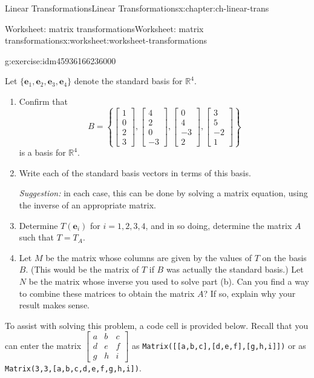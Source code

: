 \documentclass[oneside,10pt,]{book}
\newcommand{\mono}[1]{\texttt{#1}}
\numberwithin{equation}{section}
\newcommand{\R}{\mathbb{R}}
\newcommand{\vece}{\mathbf{e}}
\newcommand{\amp}{&}
\begin{document}
\begin{chapterptx}{Linear Transformations}{}{Linear Transformations}{}{}{x:chapter:ch-linear-trans}
\begin{worksheet-section}{Worksheet: matrix transformations}{}{Worksheet: matrix transformations}{}{}{x:worksheet:worksheet-transformations}
\begin{divisionexercise}{1}{}{}{g:exercise:idm45936166236000}
\begin{equation*}
\end{equation*}
%
\par
Let \(\{\vece_1,\vece_2,\vece_3, \vece_4\}\) denote the standard basis for \(\R^4\).%
\begin{enumerate}[font=\bfseries,label=(\alph*),ref=\alph*]
\item{}Confirm that%
\begin{equation*}
B=\left\{\begin{bmatrix}1\\0\\2\\3\end{bmatrix},\begin{bmatrix}4\\2\\0\\-3\end{bmatrix},
\begin{bmatrix}0\\4\\-3\\2\end{bmatrix}, \begin{bmatrix}3\\5\\-2\\1\end{bmatrix}\right\}
\end{equation*}
is a basis for \(\R^4\).%
\item{}Write each of the standard basis vectors in terms of this basis.%
\par
\emph{Suggestion:} in each case, this can be done by solving a matrix equation, using the inverse of an appropriate matrix.%
\item{}Determine \(T(\vece_i)\) for \(i=1,2,3,4\), and in so doing, determine the matrix \(A\) such that \(T=T_A\).%
\item{}Let \(M\) be the matrix whose columns are given by the values of \(T\) on the basis \(B\). (This would be the matrix of \(T\) if \(B\) was actually the standard basis.) Let \(N\) be the matrix whose inverse you used to solve part (b). Can you find a way to combine these matrices to obtain the matrix \(A\)? If so, explain why your result makes sense.%
\end{enumerate}
\end{divisionexercise}%
To assist with solving this problem, a code cell is provided below. Recall that you can enter the matrix \(\begin{bmatrix}a\amp b\amp c\\d\amp e\amp f\\g\amp h\amp i\end{bmatrix}\) as \mono{Matrix([[a,b,c],[d,e,f],[g,h,i]])} or as \mono{Matrix(3,3,[a,b,c,d,e,f,g,h,i])}.%

\end{worksheet-section}
\end{chapterptx}
\end{document}

